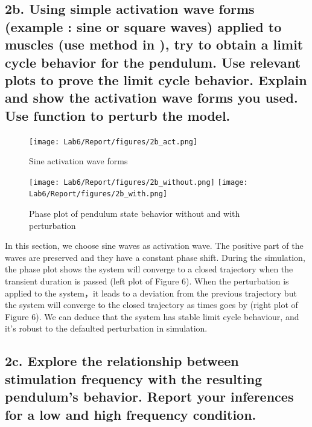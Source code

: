 \documentclass{cmc}
\begin{document}
\subsection*{2b. Using simple activation wave forms (example : sine or
  square waves) applied to muscles (use
   method in
  ), try to obtain a limit cycle behavior for
  the pendulum. Use relevant plots to prove the limit cycle behavior.
  Explain and show the activation wave forms you used. Use
  function to perturb the model.}
\label{sec:2b}

\begin{figure}[H]
  \centering
  \texttt{[image: Lab6/Report/figures/2b\_act.png]}
  \caption{Sine activation wave forms }
  \label{2b_act}
\end{figure}

\begin{figure}[H]
  \centering
  \texttt{[image: Lab6/Report/figures/2b\_without.png]}
  \texttt{[image: Lab6/Report/figures/2b\_with.png]}
  \caption{Phase plot of pendulum state behavior without and with perturbation }
  \label{2b_phase}
\end{figure}


In this section, we choose sine waves as activation wave. The positive part of the waves are preserved and they have a constant phase shift.
During the simulation, the phase plot shows the system will converge to a closed trajectory when the transient duration is passed (left plot of Figure 6). When the perturbation is applied to the system，it leads to a deviation from the previous trajectory but the system will converge to the closed trajectory as times goes by (right plot of Figure 6). We can deduce that the system has stable limit cycle behaviour, and it's robust to the defaulted perturbation in simulation.


\subsection*{2c. Explore the relationship between stimulation
  frequency with the resulting pendulum's behavior.  Report your
  inferences for a low and high frequency condition.  }
\label{sec:2c}
\end{document}
